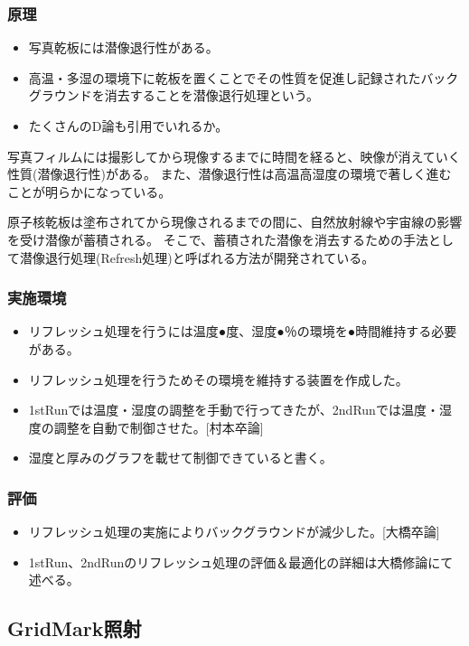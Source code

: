 \documentclass[12pt,a4paper]{jarticle}
\begin{document}
\subsubsection{原理}
\begin{itemize}
 \item 写真乾板には潜像退行性がある。
 \item 高温・多湿の環境下に乾板を置くことでその性質を促進し記録されたバックグラウンドを消去することを潜像退行処理という。
 \item たくさんのD論も引用でいれるか。
\end{itemize}
写真フィルムには撮影してから現像するまでに時間を経ると、映像が消えていく性質(潜像退行性)がある。
また、潜像退行性は高温高湿度の環境で著しく進むことが明らかになっている。
\par
原子核乾板は塗布されてから現像されるまでの間に、自然放射線や宇宙線の影響を受け潜像が蓄積される。
そこで、蓄積された潜像を消去するための手法として潜像退行処理(Refresh処理)と呼ばれる方法が開発されている。
\cite{takusann}
\subsubsection{実施環境}
\begin{itemize}
 \item リフレッシュ処理を行うには温度●度、湿度●％の環境を●時間維持する必要がある。
 \item リフレッシュ処理を行うためその環境を維持する装置を作成した。
 \item 1stRunでは温度・湿度の調整を手動で行ってきたが、2ndRunでは温度・湿度の調整を自動で制御させた。[村本卒論]
 \item 湿度と厚みのグラフを載せて制御できていると書く。
\end{itemize}
\subsubsection{評価}
\begin{itemize}
 \item リフレッシュ処理の実施によりバックグラウンドが減少した。[大橋卒論]
 \item 1stRun、2ndRunのリフレッシュ処理の評価＆最適化の詳細は大橋修論にて述べる。
\end{itemize}
\subsection{GridMark照射}
\end{document}
